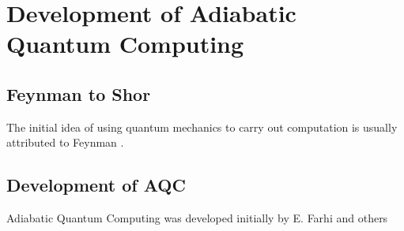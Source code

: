 \chapter{Development of Adiabatic Quantum Computing}
\section{Feynman to Shor}
The initial idea of using quantum mechanics to carry out computation is usually attributed to Feynman \cite{feynman}.
\section{Development of AQC}
Adiabatic Quantum Computing was developed initially by E. Farhi and others\cite{farhi}
